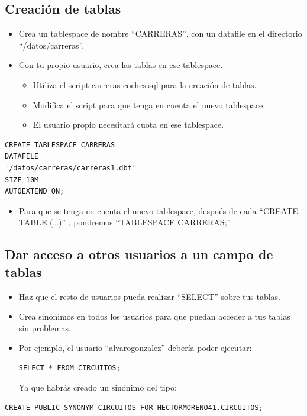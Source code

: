 \documentclass[11pt]{article}
\begin{document}
\subsection{Creación de tablas}
\label{sec:org4e93f32}

\begin{itemize}
\item Crea un tablespace de nombre ``CARRERAS'', con un datafile en el directorio ``/datos/carreras''.

\item Con tu propio usuario, crea las tablas en ese tablespace.

\begin{itemize}
\item Utiliza el script carreras-coches.sql para la creación de tablas.
\item Modifica el script para que tenga en cuenta el nuevo tablespace.
\item El usuario propio necesitará cuota en ese tablespace.
\end{itemize}
\end{itemize}

\begin{verbatim}
CREATE TABLESPACE CARRERAS
DATAFILE
'/datos/carreras/carreras1.dbf'
SIZE 10M
AUTOEXTEND ON;
\end{verbatim}

\begin{itemize}
\item Para que se tenga en cuenta el nuevo tablespace, después de cada ``CREATE TABLE (\ldots{})'' , pondremos ``TABLESPACE CARRERAS;''
\end{itemize}
\subsection{Dar acceso a otros usuarios a un campo de tablas}
\label{sec:org516f560}

\begin{itemize}
\item Haz que el resto de usuarios pueda realizar ``SELECT'' sobre tus tablas.

\item Crea sinónimos en todos los usuarios para que puedan acceder a tus tablas sin problemas.

\item Por ejemplo, el usuario ``alvarogonzalez'' debería poder ejecutar:
\begin{verbatim}
SELECT * FROM CIRCUITOS;
\end{verbatim}
Ya que habrás creado un sinónimo del tipo:
\end{itemize}
\begin{verbatim}
CREATE PUBLIC SYNONYM CIRCUITOS FOR HECTORMORENO41.CIRCUITOS;
\end{verbatim}
\end{document}
